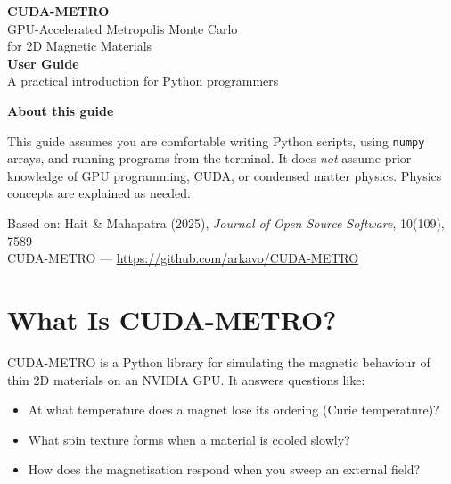 \documentclass[12pt,a4paper]{article}
\newcommand{\code}[1]{\texttt{#1}}
\begin{document}
\begin{titlepage}
  \centering
  \vspace*{2cm}
  {\Huge\bfseries\color{titlecolor} CUDA-METRO}\\[0.5em]
  {\large\color{gray} GPU-Accelerated Metropolis Monte Carlo\\for 2D Magnetic Materials}\\[2.5cm]

  {\Large\bfseries User Guide}\\[0.5em]
  {\normalsize A practical introduction for Python programmers}\\[3cm]

  \begin{mdframed}[
    backgroundcolor=noteblue,
    linecolor=noteborder,
    linewidth=1pt,
    innerleftmargin=20pt,
    innerrightmargin=20pt,
    innertopmargin=15pt,
    innerbottommargin=15pt,
  ]
  \centering
  \textbf{About this guide}\\[0.5em]
  \begin{flushleft}
  This guide assumes you are comfortable writing Python scripts, using
  \code{numpy} arrays, and running programs from the terminal.
  It does \emph{not} assume prior knowledge of GPU programming, CUDA, or
  condensed matter physics. Physics concepts are explained as needed.
  \end{flushleft}
  \end{mdframed}

  \vfill
  {\small Based on: Hait \& Mahapatra (2025), \textit{Journal of Open Source Software}, 10(109), 7589}\\[0.5em]
  {\small\color{gray} CUDA-METRO --- \url{https://github.com/arkavo/CUDA-METRO}}
\end{titlepage}

\tableofcontents
\newpage

\section{What Is CUDA-METRO?}

CUDA-METRO is a Python library for simulating the magnetic behaviour of
thin 2D materials on an NVIDIA GPU. It answers questions like:

\begin{itemize}
  \item At what temperature does a magnet lose its ordering (Curie temperature)?
  \item What spin texture forms when a material is cooled slowly?
  \item How does the magnetisation respond when you sweep an external field?
\end{itemize}
\end{document}
